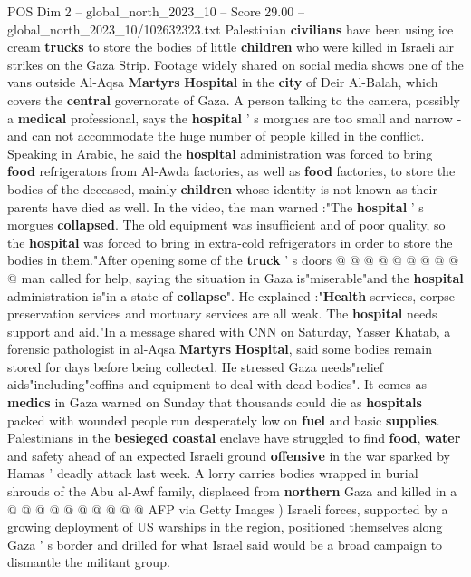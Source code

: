 \begin{textsample}{POS Dim 2 – global\_north\_2023\_10 – Score 29.00 – global\_north\_2023\_10/102632323.txt}  \label{ex:f2_pos_289}
Palestinian \textbf{civilians} have been using ice cream \textbf{trucks} to store the bodies of little \textbf{children} who were killed in Israeli air strikes on the Gaza Strip.
Footage widely shared on social media shows one of the vans outside Al-Aqsa \textbf{Martyrs} \textbf{Hospital} in the \textbf{city} of Deir Al-Balah, which covers the \textbf{central} governorate of Gaza.
A person talking to the camera, possibly a \textbf{medical} professional, says the \textbf{hospital} ' s morgues are too small and narrow - and can not accommodate the huge number of people killed in the conflict.
Speaking in Arabic, he said the \textbf{hospital} administration was forced to bring \textbf{food} refrigerators from Al-Awda factories, as well as \textbf{food} factories, to store the bodies of the deceased, mainly \textbf{children} whose identity is not known as their parents have died as well.
In the video, the man warned :"The \textbf{hospital} ' s morgues \textbf{collapsed}.
The old equipment was insufficient and of poor quality, so the \textbf{hospital} was forced to bring in extra-cold refrigerators in order to store the bodies in them."After opening some of the \textbf{truck} ' s doors @ @ @ @ @ @ @ @ @ @ man called for help, saying the situation in Gaza is"miserable"and the \textbf{hospital} administration is"in a state of \textbf{collapse}".
He explained :"\textbf{Health} services, corpse preservation services and mortuary services are all weak.
The \textbf{hospital} needs support and aid."In a message shared with CNN on Saturday, Yasser Khatab, a forensic pathologist in al-Aqsa \textbf{Martyrs} \textbf{Hospital}, said some bodies remain stored for days before being collected.
He stressed Gaza needs"relief aids"including"coffins and equipment to deal with dead bodies".
It comes as \textbf{medics} in Gaza warned on Sunday that thousands could die as \textbf{hospitals} packed with wounded people run desperately low on \textbf{fuel} and basic \textbf{supplies}.
Palestinians in the \textbf{besieged} \textbf{coastal} enclave have struggled to find \textbf{food}, \textbf{water} and safety ahead of an expected Israeli ground \textbf{offensive} in the war sparked by Hamas ' deadly attack last week.
A lorry carries bodies wrapped in burial shrouds of the Abu al-Awf family, displaced from \textbf{northern} Gaza and killed in a @ @ @ @ @ @ @ @ @ @ AFP via Getty Images ) Israeli forces, supported by a growing deployment of US warships in the region, positioned themselves along Gaza ' s border and drilled for what Israel said would be a broad campaign to dismantle the militant group.

\end{textsample}
